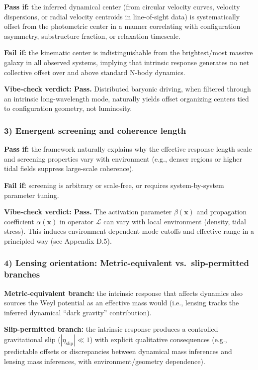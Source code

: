\documentclass[11pt]{article}
\begin{document}
\textbf{Pass if:} the inferred dynamical center (from circular velocity curves, velocity 
dispersions, or radial velocity centroids in line-of-sight data) is systematically offset 
from the photometric center in a manner correlating with configuration asymmetry, 
substructure fraction, or relaxation timescale.

\textbf{Fail if:} the kinematic center is indistinguishable from the brightest/most massive 
galaxy in all observed systems, implying that intrinsic response generates no net collective 
offset over and above standard N-body dynamics.

\checkmark \textbf{Vibe-check verdict: Pass.} Distributed baryonic driving, when filtered 
through an intrinsic long-wavelength mode, naturally yields offset organizing centers tied 
to configuration geometry, not luminosity.

\subsubsection{3) Emergent screening and coherence length}

\textbf{Pass if:} the framework naturally explains why the effective response length scale 
and screening properties vary with environment (e.g., denser regions or higher tidal fields 
suppress large-scale coherence).

\textbf{Fail if:} screening is arbitrary or scale-free, or requires system-by-system 
parameter tuning.

\checkmark \textbf{Vibe-check verdict: Pass.} The activation parameter $\beta(\mathbf{x})$ 
and propagation coefficient $\alpha(\mathbf{x})$ in operator $\mathcal{L}$ can vary with 
local environment (density, tidal stress). This induces environment-dependent mode cutoffs 
and effective range in a principled way (see Appendix D.5).

\subsubsection{4) Lensing orientation: Metric-equivalent vs.\ slip-permitted branches}

\textbf{Metric-equivalent branch:} the intrinsic response that affects dynamics also 
sources the Weyl potential as an effective mass would (i.e., lensing tracks the inferred 
dynamical ``dark gravity'' contribution).

\textbf{Slip-permitted branch:} the intrinsic response produces a controlled gravitational 
slip ($|\eta_{\text{slip}}| \ll 1$) with explicit qualitative consequences (e.g., predictable 
offsets or discrepancies between dynamical mass inferences and lensing mass inferences, with 
environment/geometry dependence).
\end{document}
